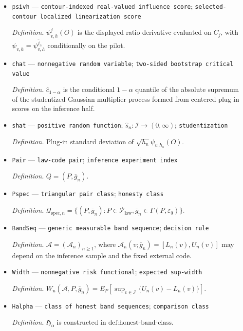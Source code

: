 \documentclass{article}
\begin{document}
\begin{itemize}
  \item \texttt{psivh} --- \texttt{contour-\allowbreak{}indexed real-\allowbreak{}valued influence score}; \texttt{selected-\allowbreak{}contour localized linearization score}
  \par\smallskip\noindent\emph{Definition.} \(\psi^j_{v,h}(O)\) is the displayed ratio derivative evaluated on \(C_j\), with \(\psi_{v,h}=\psi^{\widehat j_n}_{v,h}\) conditionally on the pilot.
  \item \texttt{chat} --- \texttt{nonnegative random variable}; \texttt{two-\allowbreak{}sided bootstrap critical value}
  \par\smallskip\noindent\emph{Definition.} \(\widehat c_{1-\alpha}\) is the conditional \(1-\alpha\) quantile of the absolute supremum of the studentized Gaussian multiplier process formed from centered plug-in scores on the inference half.
  \item \texttt{shat} --- \texttt{positive random function}; \(\widehat s_n:\mathcal I\to(0,\infty)\); \texttt{studentization}
  \par\smallskip\noindent\emph{Definition.} Plug-in standard deviation of \(\sqrt{h_n}\psi_{v,h_n}(O)\).
  \item \texttt{Pair} --- \texttt{law-\allowbreak{}code pair}; \texttt{inference experiment index}
  \par\smallskip\noindent\emph{Definition.} \(Q=(P,\bar g_n)\).
  \item \texttt{Pspec} --- \texttt{triangular pair class}; \texttt{honesty class}
  \par\smallskip\noindent\emph{Definition.} \(\mathcal Q_{\mathrm{spec},n}=\{(P,\bar g_n):P\in\mathcal P_{\mathrm{law}},\bar g_n\in\Gamma(P,\varepsilon_0)\}\).
  \item \texttt{BandSeq} --- \texttt{generic measurable band sequence}; \texttt{decision rule}
  \par\smallskip\noindent\emph{Definition.} \(\mathcal A=(\mathcal A_n)_{n\ge1}\), where \(\mathcal A_n(v;\bar g_n)=[L_n(v),U_n(v)]\) may depend on the inference sample and the fixed external code.
  \item \texttt{Width} --- \texttt{nonnegative risk functional}; \texttt{expected sup-\allowbreak{}width}
  \par\smallskip\noindent\emph{Definition.} \(W_n(\mathcal A,P,\bar g_n)=E_P[\sup_{v\in\mathcal I}\{U_n(v)-L_n(v)\}]\).
  \item \texttt{Halpha} --- \texttt{class of honest band sequences}; \texttt{comparison class}
  \par\smallskip\noindent\emph{Definition.} \(\mathfrak H_\alpha\) is constructed in \(\text{def:honest-band-class}\).

\end{itemize}
\end{document}
